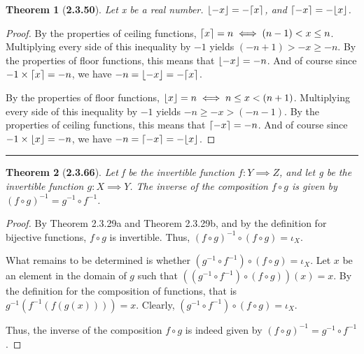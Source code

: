 \documentclass[a4paper, 12pt]{article}
\theoremstyle{plain}
\newtheorem*{theorem*}{Theorem}
\DeclarePairedDelimiter{\floor}{\lfloor}{\rfloor}
\DeclarePairedDelimiter{\ceil}{\lceil}{\rceil}
\begin{document}
\begin{theorem*}[\textbf{2.3.50}]
    Let x be a real number. \newline $\floor{-x} = -\ceil{x}$, and $\ceil{-x} = -\floor{x}$.
\end{theorem*}

\begin{proof}
    By the properties of ceiling functions, \newline $\ceil{x} = n \iff (n-1) < x \le n$. 
    Multiplying every side of this inequality by $-1$ yields $(-n + 1) > -x \ge -n$. By the 
    properties of floor functions, this means that $\floor{-x} = -n$. And of course since 
    $-1 \times \ceil{x} = -n$, we have $-n = \floor{-x} = -\ceil{x}$.
    
    By the properties of floor functions, \newline $\floor{x} = n \iff n \le x < (n+1)$. 
    Multiplying every side of this inequality by $-1$ yields $-n \ge -x > (-n-1)$. By the 
    properties of ceiling functions, this means that $\ceil{-x} = -n$. And of course since 
    $-1 \times \floor{x} = -n$, we have $-n = \ceil{-x} = -\floor{x}$.
\end{proof}
\begin{center}
    \rule{5.4in}{1pt}
\end{center}


\begin{theorem*}[\textbf{2.3.66}]
    Let f be the invertible function $f: Y \implies Z$, and let \newline g be the invertible 
    function $g: X \implies Y$. The inverse of the composition $f \circ g$ is given by 
    $(f \circ g)^{-1} = g^{-1} \circ f^{-1}$.
\end{theorem*}

\begin{proof}
    By Theorem 2.3.29a and Theorem 2.3.29b, and by the definition for bijective functions, 
    $f \circ g$ is invertible. Thus, $(f \circ g)^{-1} \circ (f \circ g) = \iota_X$. 
    
    What remains to be determined is whether $(g^{-1} \circ f^{-1}) \circ (f \circ g) = \iota_X$. 
    Let $x$ be an element in the domain of $g$ such that 
    $((g^{-1} \circ f^{-1}) \circ (f \circ g))(x) = x$. By the definition for the composition of 
    functions, that is $g^{-1}(f^{-1}(f(g(x)))) = x$. Clearly, 
    $(g^{-1} \circ f^{-1}) \circ (f \circ g) = \iota_X$.
    
    Thus, the inverse of the composition $f \circ g$ is indeed given by \newline 
    $(f \circ g)^{-1} = g^{-1} \circ f^{-1}$.
\end{proof}
\end{document}
